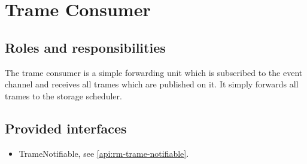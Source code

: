 \section{Trame Consumer}
\label{element:rm-trame-consumer}

\subsection{Roles and responsibilities}

\npar The trame consumer is a simple forwarding unit which is subscribed to the
event channel and receives all trames which are published on it. It simply
forwards all trames to the storage scheduler.

\subsection{Provided interfaces}

\begin{itemize}
  \item TrameNotifiable, see \ref{api:rm-trame-notifiable}.
\end{itemize}

